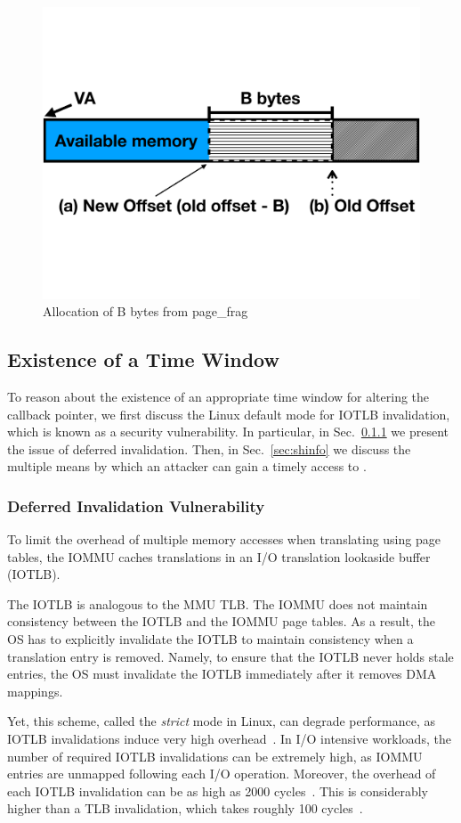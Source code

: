 \begin{figure}[t]
    \centering
    \includegraphics[width=0.65\linewidth,trim=0 6cm 0 6cm, clip]{figs/page_frag.pdf}
    \caption{Allocation of B bytes from page\_frag}
    \label{fig:page_frags}
\end{figure}

\subsection{Existence of a Time Window}\label{sec:timely}
To reason about the existence of an appropriate time window for altering the callback pointer, we first discuss the Linux default mode for IOTLB invalidation, which is known as a security vulnerability\cite{MMT16,MSMT18}.
In particular, in Sec.~\ref{sec:deferred} we present the issue of deferred invalidation. Then, in Sec.~\ref{sec:shinfo} we discuss the multiple means by which an attacker can gain a timely access to \shinfo.

\subsubsection{Deferred Invalidation Vulnerability}\label{sec:deferred}

To limit the overhead of multiple memory accesses when translating \iova{} using page tables, the IOMMU caches translations in an I/O translation lookaside buffer (IOTLB). 

The IOTLB is analogous to the MMU TLB. The IOMMU does not maintain consistency between the IOTLB and the IOMMU page tables. As a result, the OS has to explicitly invalidate the IOTLB to maintain consistency when a translation entry is removed. Namely, to ensure that the IOTLB never holds stale entries, the OS must invalidate the IOTLB immediately after it removes DMA mappings. 

Yet, this scheme, called the \emph{strict} mode in Linux, can degrade performance, as IOTLB invalidations induce very high overhead~\cite{MMT16,MSMT18,Peleg15}. In I/O intensive workloads, the number of required IOTLB invalidations can be extremely high, as IOMMU entries are unmapped following each I/O operation. Moreover, the overhead of each IOTLB invalidation can be as high as 2000 cycles~\cite{ABYTS11}. This is considerably higher than a TLB invalidation, which takes roughly 100 cycles~\cite{Han14}. 

